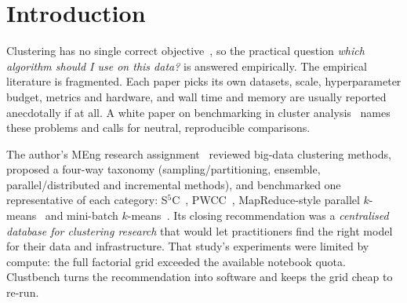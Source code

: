 \documentclass[11pt,a4paper]{article}
\begin{document}
\section{Introduction}

Clustering has no single correct objective~\cite{kleinberg2002impossibility},
so the practical question \emph{which algorithm should I use on this data?}
is answered empirically. The empirical literature is fragmented. Each paper
picks its own datasets, scale, hyperparameter budget, metrics and hardware,
and wall time and memory are usually reported anecdotally if at all. A
white paper on benchmarking in cluster analysis~\cite{vanmechelen2018benchmarking}
names these problems and calls for neutral, reproducible comparisons.

The author's MEng research assignment~\cite{maharaj2024review} reviewed big-data
clustering methods, proposed a four-way taxonomy (sampling/partitioning,
ensemble, parallel/distributed and incremental methods), and benchmarked one
representative of each category: S$^5$C~\cite{matsushima2019s5c},
PWCC~\cite{alguliyev2020weighted}, MapReduce-style parallel
$k$-means~\cite{zhao2009parallel} and mini-batch $k$-means~\cite{sculley2010web}.
Its closing recommendation was a \emph{centralised database for clustering
research} that would let practitioners find the right model for their data and
infrastructure. That study's experiments were limited by compute: the full
factorial grid exceeded the available notebook quota. Clustbench turns the
recommendation into software and keeps the grid cheap to re-run.
\end{document}
